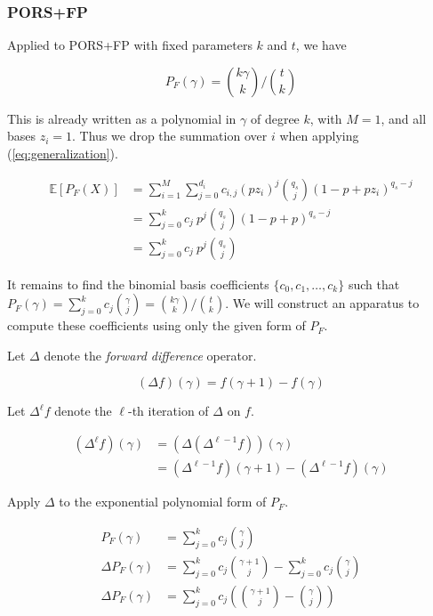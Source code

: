 \documentclass[11pt]{article}
\begin{document}
\subsubsection{PORS+FP}

Applied to PORS+FP \cite{forced_pruning} with fixed parameters $k$ and $t$, we have

\begin{equation}
\label{eq:pors-pf}
  P_F(\gamma) = \binom{k \gamma}{k} / \binom{t}{k}
\end{equation}

This is already written as a polynomial in $\gamma$ of degree $k$, with $M = 1$, and all bases $z_i = 1$. Thus we drop the summation over $i$ when applying (\ref{eq:generalization}).

\begin{align}
  \mathbb E[P_F(X)]
    &= \sum_{i = 1}^M \sum_{j=0}^{d_i} c_{i, j} (p z_i)^j \binom{q_s}{j} \left(1 - p + p z_i \right)^{q_s - j} \\
    &= \sum_{j=0}^k c_j\ p^j \binom{q_s}{j} \left(1 - p + p \right)^{q_s - j} \\
    &= \sum_{j=0}^k c_j\ p^j \binom{q_s}{j} \label{eq:pors-forge-succinct}
\end{align}

It remains to find the binomial basis coefficients $\{c_0, c_1, \ldots, c_k\}$ such that $P_F(\gamma) = \sum_{j=0}^k c_j \binom{\gamma}{j} = \binom{k \gamma}{k} / \binom{t}{k}$. We will construct an apparatus to compute these coefficients using only the given form of $P_F$.

Let $\Delta$ denote the \emph{forward difference} operator.

\begin{equation}
\label{eq:forward-diff}
  (\Delta f)(\gamma) = f(\gamma + 1) - f(\gamma)
\end{equation}

Let $\Delta^\ell f$ denote the $\ell$-th iteration of $\Delta$ on $f$.

\begin{align}
  (\Delta^\ell f)(\gamma) &= \left(\Delta (\Delta^{\ell-1} f) \right)(\gamma) \\
    &= (\Delta^{\ell-1} f)(\gamma + 1) - (\Delta^{\ell-1} f)(\gamma)
\end{align}

Apply $\Delta$ to the exponential polynomial form of $P_F$.

\begin{align}
  P_F(\gamma) &= \sum_{j=0}^k c_j \binom{\gamma}{j} \\
  \Delta P_F(\gamma) &= \sum_{j=0}^k c_j \binom{\gamma + 1}{j} - \sum_{j=0}^k c_j \binom{\gamma}{j} \\
  \Delta P_F(\gamma) &= \sum_{j=0}^k c_j \left( \binom{\gamma + 1}{j} - \binom{\gamma}{j} \right)
\end{align}
\end{document}
